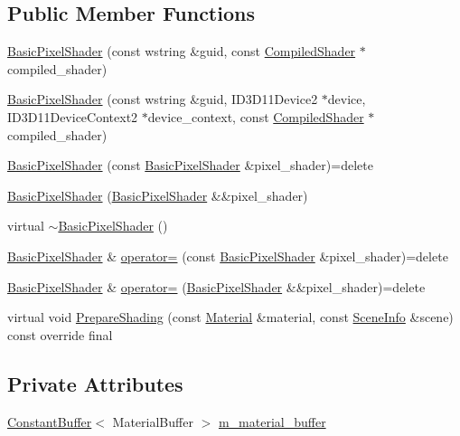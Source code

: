 \subsection*{Public Member Functions}
\begin{DoxyCompactItemize}
\item 
\hyperlink{classmage_1_1_basic_pixel_shader_a2dcc3710daa0333a835fc7ffd1d9ef86}{Basic\+Pixel\+Shader} (const wstring \&guid, const \hyperlink{structmage_1_1_compiled_shader}{Compiled\+Shader} $\ast$compiled\+\_\+shader)
\item 
\hyperlink{classmage_1_1_basic_pixel_shader_a1d4b0bc93865e58c52016d373b6c1cfe}{Basic\+Pixel\+Shader} (const wstring \&guid, I\+D3\+D11\+Device2 $\ast$device, I\+D3\+D11\+Device\+Context2 $\ast$device\+\_\+context, const \hyperlink{structmage_1_1_compiled_shader}{Compiled\+Shader} $\ast$compiled\+\_\+shader)
\item 
\hyperlink{classmage_1_1_basic_pixel_shader_ab82055206ff2a05b73f18ce23353a4bb}{Basic\+Pixel\+Shader} (const \hyperlink{classmage_1_1_basic_pixel_shader}{Basic\+Pixel\+Shader} \&pixel\+\_\+shader)=delete
\item 
\hyperlink{classmage_1_1_basic_pixel_shader_a0a5366edb694e78e4c8075fad70b7dff}{Basic\+Pixel\+Shader} (\hyperlink{classmage_1_1_basic_pixel_shader}{Basic\+Pixel\+Shader} \&\&pixel\+\_\+shader)
\item 
virtual \hyperlink{classmage_1_1_basic_pixel_shader_a7b4ac308850eb9ad55cbbd1e6389271b}{$\sim$\+Basic\+Pixel\+Shader} ()
\item 
\hyperlink{classmage_1_1_basic_pixel_shader}{Basic\+Pixel\+Shader} \& \hyperlink{classmage_1_1_basic_pixel_shader_a9656fdae2d17691d3e7dd850e7844efb}{operator=} (const \hyperlink{classmage_1_1_basic_pixel_shader}{Basic\+Pixel\+Shader} \&pixel\+\_\+shader)=delete
\item 
\hyperlink{classmage_1_1_basic_pixel_shader}{Basic\+Pixel\+Shader} \& \hyperlink{classmage_1_1_basic_pixel_shader_a5d6224f0454d1d1f9583f6b9f8ad8201}{operator=} (\hyperlink{classmage_1_1_basic_pixel_shader}{Basic\+Pixel\+Shader} \&\&pixel\+\_\+shader)=delete
\item 
virtual void \hyperlink{classmage_1_1_basic_pixel_shader_a95b6a4ed73ac8c9b31348e93f1fdf99d}{Prepare\+Shading} (const \hyperlink{structmage_1_1_material}{Material} \&material, const \hyperlink{structmage_1_1_scene_info}{Scene\+Info} \&scene) const override final
\end{DoxyCompactItemize}
\subsection*{Private Attributes}
\begin{DoxyCompactItemize}
\item 
\hyperlink{structmage_1_1_constant_buffer}{Constant\+Buffer}$<$ Material\+Buffer $>$ \hyperlink{classmage_1_1_basic_pixel_shader_aa61f52d3524276e234dbd2a1f3f13d6d}{m\+\_\+material\+\_\+buffer}
\end{DoxyCompactItemize}
